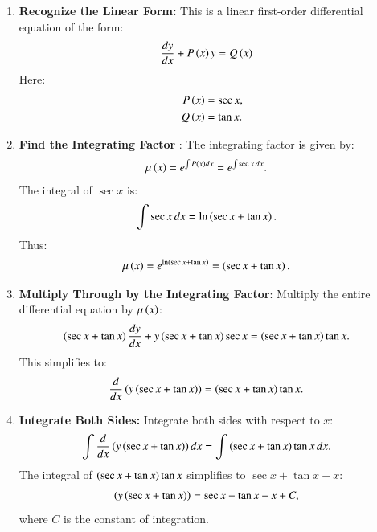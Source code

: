 \documentclass[journal]{IEEEtran}
\begin{document}
\begin{enumerate}
	\item \textbf{Recognize the Linear Form:}
  This is a linear first-order differential equation of the form:
  \begin{align}
	  \frac{dy}{dx} + P\left(x\right)y &= Q\left(x\right)
  \end{align}
  Here:
  \begin{align}
	  P\left(x\right) &= \sec x, \\
	  Q\left(x\right) &= \tan x.
  \end{align}

  \item \textbf{Find the Integrating Factor }:
  The integrating factor is given by:
  \begin{align}
	  \mu\left(x\right) &= e^{\int P\left(x\right) dx} = e^{\int \sec x \, dx}.
  \end{align}
  The integral of $\sec x$ is:
  \begin{align}
  \int \sec x \, dx &= \ln \left(\sec x + \tan x\right).
  \end{align}
  Thus:
  \begin{align}
	  \mu\left(x\right) &= e^{\ln \left(\sec x + \tan x\right)} = \left(\sec x + \tan x\right).
  \end{align}

  \item \textbf{Multiply Through by the Integrating Factor}:
	  Multiply the entire differential equation by $\mu\left(x\right)$:
  \begin{align}
  \left(\sec x + \tan x\right) \frac{dy}{dx} + y \left(\sec x + \tan x\right) \sec x &= \left(\sec x + \tan x\right) \tan x.
  \end{align}
  This simplifies to:
  \begin{align}
  \frac{d}{dx} \left(y \left(\sec x + \tan x\right)\right) &= \left(\sec x + \tan x\right) \tan x.
  \end{align}

  \item \textbf{Integrate Both Sides:}
  Integrate both sides with respect to $x$:
  \begin{align}
  \int \frac{d}{dx} \left(y \left(\sec x + \tan x\right)\right) dx &= \int \left(\sec x + \tan x\right) \tan x \, dx.
  \end{align}
  The integral of $\left(\sec x + \tan x\right) \tan x$ simplifies to $\sec x + \tan x - x$:
  \begin{align}
  \left(y \left(\sec x + \tan x\right)\right) &= \sec x + \tan x -x + C,
  \end{align}
  where $C$ is the constant of integration.


\end{enumerate}
\end{document}
